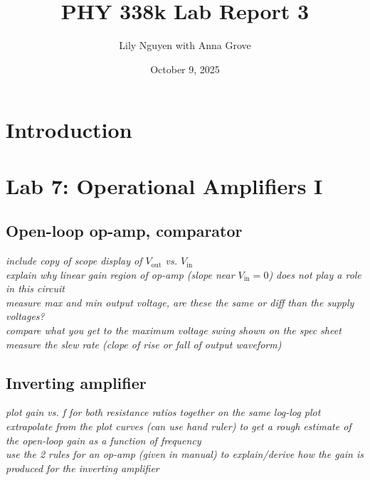 \documentclass{article}
\title{PHY 338k Lab Report 3}
\author{Lily Nguyen with Anna Grove}
\date{October 9, 2025}
\begin{document}
\maketitle

\section{Introduction}


\section{Lab 7: Operational Amplifiers I}

\subsection{Open-loop op-amp, comparator}

\textit{include copy of scope display of $V_\text{out}$ vs. $V_\text{in}$}\\

\noindent\textit{explain why linear gain region of op-amp (slope near $V_\text{in}=0$) does not play a role in this circuit}\\

\noindent\textit{measure max and min output voltage, are these the same or diff than the supply voltages?}\\

\noindent\textit{compare what you get to the maximum voltage swing shown on the spec sheet}\\

\noindent\textit{measure the slew rate (clope of rise or fall of output waveform)}\\



\subsection{Inverting amplifier}

\textit{plot gain vs. f for both resistance ratios together on the same log-log plot}\\

\noindent\textit{extrapolate from the plot curves (can use hand ruler) to get a rough estimate of the open-loop gain as a function of frequency}\\

\noindent\textit{use the 2 rules for an op-amp (given in manual) to explain/derive how the gain is produced for the inverting amplifier}
\end{document}
